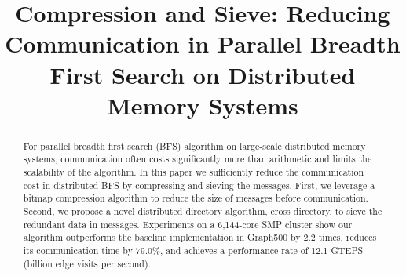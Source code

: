 \documentclass[conference]{IEEEtran}
\begin{document}
\title{Compression and Sieve: Reducing Communication in Parallel Breadth
  First Search on Distributed Memory Systems}


\author{
   }















\maketitle


\begin{abstract}
For parallel breadth first search (BFS) algorithm on large-scale distributed
  memory systems, communication often costs significantly more than arithmetic
  and limits the scalability of the algorithm. In this paper we sufficiently
  reduce the communication cost in distributed BFS by compressing and sieving
  the messages. First, we leverage a bitmap compression algorithm to reduce
  the size of messages before communication.  Second, we propose a novel
  distributed directory algorithm, cross directory, to sieve the redundant
  data in messages.  Experiments on a 6,144-core SMP cluster show our
  algorithm outperforms the baseline implementation in Graph500 by 2.2 times,
  reduces its communication time by 79.0\%, and achieves a performance rate of
  12.1 GTEPS (billion edge visits per second).
\end{abstract}







\IEEEpeerreviewmaketitle
\end{document}
